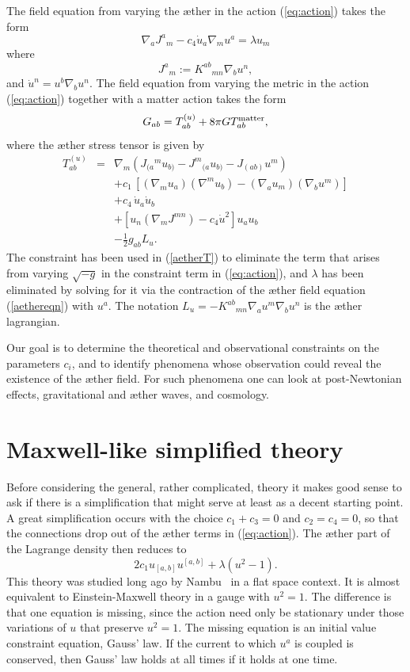\documentclass[aps]{ws-procs9x6}
\def\beq{\begin{equation}}
\def\eeq{\end{equation}}
\def\l{\lambda}
\def\nab{\nabla}
\begin{document}
The field equation from varying the
{\ae}ther in the action (\ref{eq:action})
takes the form
%
\beq
\nab_a J^a{}_m -c_4 \dot{u}_a \nab_m u^a= \lambda u_m
\label{aethereqn}
\eeq
%
where
%
\beq J^{a}{}_{m} := K^{ab}{}_{mn} \nabla_b u^n, \eeq
%
and $\dot{u}^n = u^b\nab_b u^n$.
The field equation from varying the
metric in the
action (\ref{eq:action}) together with a matter action
takes the form
%
\beq
G_{ab}=T^{(u)}_{ab} + 8\pi G  T^{\rm matter}_{ab},
\label{AEeqn}
\eeq
%
where the {\ae}ther stress tensor is given by\cite{ElingJ1}
%
\begin{eqnarray}
T^{(u)}_{ab}&=&
\nab_m(J_{(a}{}^m u_{b)} - J^m{}_{(a} u_{b)} - J_{(ab)}u^m) \nonumber\\
&&+ c_1\, \left[(\nab_m u_a)(\nab^m u_b) -(\nab_a u_m)(\nab_b u^m)
\right]\nonumber\\
&&+ c_4\, \dot{u}_a\dot{u}_b\nonumber\\
&&+\left[u_n(\nab_m J^{mn})-c_4\dot{u}^2\right]u_a u_b \nonumber\\
&&-\frac{1}{2} g_{ab}L_u. \label{aetherT}
\end{eqnarray}
%
The constraint has been used in (\ref{aetherT}) to eliminate the
term that arises from varying $\sqrt{-g}$ in the constraint term
in (\ref{eq:action}), and $\lambda$ has been eliminated by
solving for it via the contraction of the {\ae}ther field equation
(\ref{aethereqn})
with $u^a$. The notation $L_u=-K^{ab}{}{}_{mn} \nabla_a u^m
\nabla_b u^n$ is the {\ae}ther lagrangian.

Our goal is to determine the theoretical and observational
constraints on the parameters $c_i$, and to identify phenomena
whose observation could reveal the existence of the {\ae}ther
field. For such phenomena one can look at post-Newtonian effects,
gravitational and {\ae}ther waves, and cosmology.


\section{Maxwell-like simplified theory}
\label{sec:Maxwell}

Before considering the general, rather complicated, theory it
makes good sense to ask if there is a simplification that might
serve at least as a decent starting point. A great simplification
occurs with the choice $c_1+c_3=0$ and $c_2=c_4=0$, so that the
connections drop out of the {\ae}ther terms in (\ref{eq:action}).
The {\ae}ther part of the Lagrange density then reduces to
%
\beq
2c_1u_{[a,b]}u^{[a,b]} + \l(u^2-1).
\label{EMax}
\eeq
%
This theory was studied long ago by
Nambu~\cite{Nambu} in a flat space context.
It is almost equivalent to Einstein-Maxwell theory in a
gauge with $u^2=1$. The difference is that one equation
is missing, since the action need only be stationary
under those variations of $u$ that preserve $u^2=1$.
The missing equation is an initial value constraint
equation, Gauss' law. If the current to which $u^a$ is
coupled is conserved, then Gauss' law holds at all
times if it holds at one time.
\end{document}
